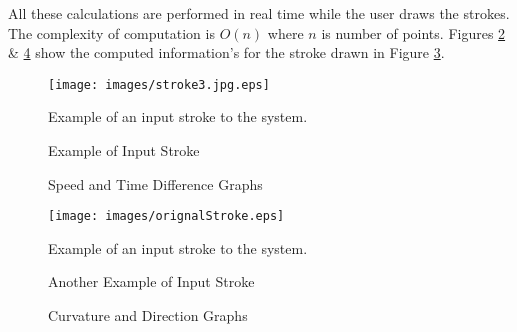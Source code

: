  All these calculations are performed in real time while the user draws the strokes. The complexity of computation is $O(n)$ where $n$ is number of points. Figures \ref{fig:speed2Distance} \&  \ref{fig:curvatures} show the computed information's for the stroke drawn in Figure \ref{fig:AnotherorignalStroke}.%

\begin{figure}[]
	\centering
		\texttt{[image: images/stroke3.jpg.eps]}
	\caption{Example of Input Stroke} Example of an input stroke to the system. 
	\label{fig:orignalStroke}
\end{figure}


\begin{figure}
	\centering
			\hfill
	\caption{Speed and Time Difference Graphs}
	\label{fig:speed2Distance}
\end{figure}

\begin{figure}[]
	\centering
		\texttt{[image: images/orignalStroke.eps]}
	\caption{Another Example of Input Stroke} Example of an input stroke to the system. 
	\label{fig:AnotherorignalStroke}
\end{figure}

\begin{figure}[]
	\centering

		
		
	
	\caption{Curvature and Direction Graphs}%
	
	\label{fig:curvatures}
\end{figure}


